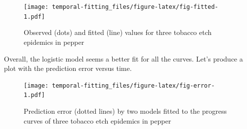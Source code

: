 \documentclass[
  letterpaper,
]{book}
\newenvironment{Shaded}{\begin{snugshade}}{\end{snugshade}}
\newcommand{\AttributeTok}[1]{\textcolor[rgb]{0.40,0.45,0.13}{#1}}
\newcommand{\CommentTok}[1]{\textcolor[rgb]{0.37,0.37,0.37}{#1}}
\newcommand{\DecValTok}[1]{\textcolor[rgb]{0.68,0.00,0.00}{#1}}
\newcommand{\FloatTok}[1]{\textcolor[rgb]{0.68,0.00,0.00}{#1}}
\newcommand{\FunctionTok}[1]{\textcolor[rgb]{0.28,0.35,0.67}{#1}}
\newcommand{\NormalTok}[1]{\textcolor[rgb]{0.00,0.23,0.31}{#1}}
\newcommand{\SpecialCharTok}[1]{\textcolor[rgb]{0.37,0.37,0.37}{#1}}
\newcommand{\StringTok}[1]{\textcolor[rgb]{0.13,0.47,0.30}{#1}}
\begin{document}
\begin{figure}

\texttt{[image: temporal-fitting\_files/figure-latex/fig-fitted-1.pdf]} \hfill{}

\caption{\label{fig-fitted}Observed (dots) and fitted (line) values for
three tobacco etch epidemics in pepper}

\end{figure}

Overall, the logistic model seems a better fit for all the curves. Let's
produce a plot with the prediction error versus time.

\begin{Shaded}
\end{Shaded}

\begin{figure}

\texttt{[image: temporal-fitting\_files/figure-latex/fig-error-1.pdf]} \hfill{}

\caption{\label{fig-error}Prediction error (dotted lines) by two models
fitted to the progress curves of three tobacco etch epidemics in pepper}

\end{figure}
\end{document}

